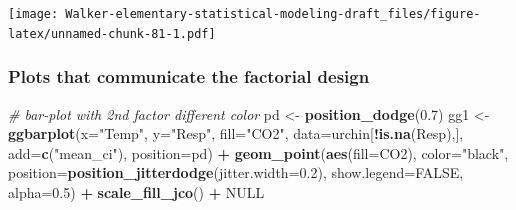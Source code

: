 \documentclass[]{book}
\newenvironment{Shaded}{\begin{snugshade}}{\end{snugshade}}
\newcommand{\KeywordTok}[1]{\textcolor[rgb]{0.13,0.29,0.53}{\textbf{#1}}}
\newcommand{\DataTypeTok}[1]{\textcolor[rgb]{0.13,0.29,0.53}{#1}}
\newcommand{\FloatTok}[1]{\textcolor[rgb]{0.00,0.00,0.81}{#1}}
\newcommand{\StringTok}[1]{\textcolor[rgb]{0.31,0.60,0.02}{#1}}
\newcommand{\CommentTok}[1]{\textcolor[rgb]{0.56,0.35,0.01}{\textit{#1}}}
\newcommand{\OtherTok}[1]{\textcolor[rgb]{0.56,0.35,0.01}{#1}}
\newcommand{\OperatorTok}[1]{\textcolor[rgb]{0.81,0.36,0.00}{\textbf{#1}}}
\newcommand{\NormalTok}[1]{#1}
\begin{document}
\texttt{[image: Walker-elementary-statistical-modeling-draft\_files/figure-latex/unnamed-chunk-81-1.pdf]}

\subsubsection{Plots that communicate the factorial
design}\label{plots-that-communicate-the-factorial-design}

\begin{Shaded}
\begin{Highlighting}[]
\CommentTok{# bar-plot with 2nd factor different color}
\NormalTok{pd <-}\StringTok{ }\KeywordTok{position_dodge}\NormalTok{(}\FloatTok{0.7}\NormalTok{)}
\NormalTok{gg1 <-}\StringTok{ }\KeywordTok{ggbarplot}\NormalTok{(}\DataTypeTok{x=}\StringTok{"Temp"}\NormalTok{,}
          \DataTypeTok{y=}\StringTok{"Resp"}\NormalTok{,}
          \DataTypeTok{fill=}\StringTok{"CO2"}\NormalTok{,}
          \DataTypeTok{data=}\NormalTok{urchin[}\OperatorTok{!}\KeywordTok{is.na}\NormalTok{(Resp),],}
          \DataTypeTok{add=}\KeywordTok{c}\NormalTok{(}\StringTok{"mean_ci"}\NormalTok{),}
          \DataTypeTok{position=}\NormalTok{pd) }\OperatorTok{+}
\StringTok{  }\KeywordTok{geom_point}\NormalTok{(}\KeywordTok{aes}\NormalTok{(}\DataTypeTok{fill=}\NormalTok{CO2), }
             \DataTypeTok{color=}\StringTok{"black"}\NormalTok{, }
             \DataTypeTok{position=}\KeywordTok{position_jitterdodge}\NormalTok{(}\DataTypeTok{jitter.width=}\FloatTok{0.2}\NormalTok{), }
             \DataTypeTok{show.legend=}\OtherTok{FALSE}\NormalTok{, }
             \DataTypeTok{alpha=}\FloatTok{0.5}\NormalTok{) }\OperatorTok{+}
\StringTok{  }\KeywordTok{scale_fill_jco}\NormalTok{() }\OperatorTok{+}
\StringTok{  }\OtherTok{NULL}


\end{Highlighting}
\end{Shaded}
\end{document}
